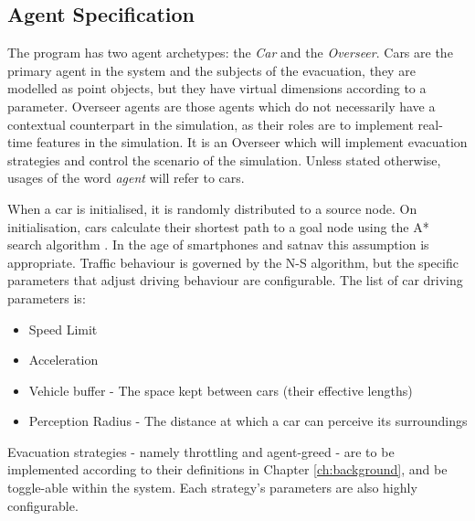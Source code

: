 \subsection{Agent Specification}
The program has two agent archetypes: the \textit{Car} and the \textit{Overseer}. Cars are the primary agent in the system and the subjects of the evacuation, they are modelled as point objects, but they have virtual dimensions according to a parameter. Overseer agents are those agents which do not necessarily have a contextual counterpart in the simulation, as their roles are to implement real-time features in the simulation. It is an Overseer which will implement evacuation strategies and control the scenario of the simulation. Unless stated otherwise, usages of the word \textit{agent} will refer to cars.

When a car is initialised, it is randomly distributed to a source node. On initialisation, cars calculate their shortest path to a goal node using the A* search algorithm \cite{Hart1968APaths}. In the age of smartphones and satnav this assumption is appropriate. Traffic behaviour is governed by the N-S algorithm, but the specific parameters that adjust driving behaviour are configurable. The list of car driving parameters is:

\begin{itemize}
    \item Speed Limit
    \item Acceleration
    \item Vehicle buffer - The space kept between cars (their effective lengths)
    \item Perception Radius - The distance at which a car can perceive its surroundings
\end{itemize}

Evacuation strategies - namely throttling and agent-greed - are to be implemented according to their definitions in Chapter \ref{ch:background}, and be toggle-able within the system. Each strategy's parameters are also highly configurable.

